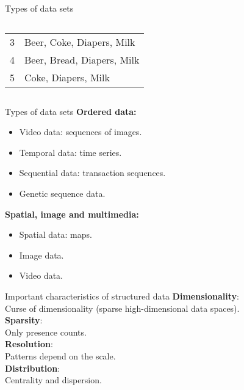 \documentclass[aspectratio=169,t]{beamer}
\begin{document}
{\begin{frame}{Types of data sets}
\begin{columns}
\begin{column}{0.45\textwidth}
\begin{table}
\begin{tabular} { | c | l |}
          3 & Beer, Coke, Diapers, Milk\\
          4 & Beer, Bread, Diapers, Milk\\
          5 & Coke, Diapers, Milk \\
          \hline
          \end{tabular}
        \end{table}
        \end{column}
      \end{columns}
    \end{frame}
  }

  { 
    \begin{frame}{Types of data sets}
          \textbf{Ordered data:}
          \begin{itemize}[noitemsep]
              \item Video data: sequences of images.
              \item Temporal data: time series.
              \item Sequential data: transaction sequences.
              \item Genetic sequence data.
          \end{itemize}
          \textbf{Spatial, image and multimedia:}
          \begin{itemize}[noitemsep]
              \item Spatial data: maps.
              \item Image data.
              \item Video data.
          \end{itemize}
    \end{frame}
  }

  { 
    \begin{frame}{Important characteristics of structured data}
        \textbf{Dimensionality}:\\
        Curse of dimensionality (sparse high-dimensional data spaces).\\[0.2cm]

        \textbf{Sparsity}:\\
        Only presence counts.\\[0.2cm]

        \textbf{Resolution}:\\
        Patterns depend on the scale.\\[0.2cm]

        \textbf{Distribution}:\\
        Centrality and dispersion.
    \end{frame}
  }
\end{document}
